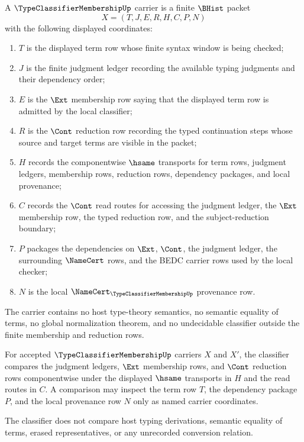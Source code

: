 \begin{definition}
\label{def:type-classifier-membership-carrier}
A $\TypeClassifierMembershipUp$ carrier is a finite $\BHist$ packet
$$
X=(T,J,E,R,H,C,P,N)
$$
with the following displayed coordinates:
\begin{enumerate}
\item $T$ is the displayed term row whose finite syntax window is being checked;
\item $J$ is the finite judgment ledger recording the available typing judgments and their dependency order;
\item $E$ is the $\Ext$ membership row saying that the displayed term row is admitted by the local classifier;
\item $R$ is the $\Cont$ reduction row recording the typed continuation steps whose source and target terms are visible in the packet;
\item $H$ records the componentwise $\hsame$ transports for term rows, judgment ledgers, membership rows, reduction rows, dependency packages, and local provenance;
\item $C$ records the $\Cont$ read routes for accessing the judgment ledger, the $\Ext$ membership row, the typed reduction row, and the subject-reduction boundary;
\item $P$ packages the dependencies on $\Ext$, $\Cont$, the judgment ledger, the surrounding $\NameCert$ rows, and the BEDC carrier rows used by the local checker;
\item $N$ is the local $\NameCert_{\TypeClassifierMembershipUp}$ provenance row.
\end{enumerate}
The carrier contains no host type-theory semantics, no semantic equality of terms, no global normalization theorem, and no undecidable classifier outside the finite membership and reduction rows.
\end{definition}

\begin{definition}
\label{def:type-classifier-membership-classifier}
For accepted $\TypeClassifierMembershipUp$ carriers $X$ and $X'$, the classifier compares the judgment ledgers, $\Ext$ membership rows, and $\Cont$ reduction rows componentwise under the displayed $\hsame$ transports in $H$ and the read routes in $C$. A comparison may inspect the term row $T$, the dependency package $P$, and the local provenance row $N$ only as named carrier coordinates.

The classifier does not compare host typing derivations, semantic equality of terms, erased representatives, or any unrecorded conversion relation.
\end{definition}

